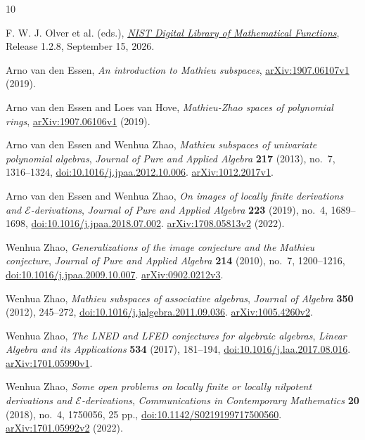 \documentclass[11pt]{article}
\begin{document}
\begin{thebibliography}{10}
\raggedright
{}
F. W. J. Olver et al. (eds.),
\href{https://dlmf.nist.gov/}{\emph{NIST Digital Library of Mathematical
Functions}}, Release 1.2.8, September 15, 2026.

Arno van den Essen, \emph{An introduction to Mathieu subspaces},
\href{https://arxiv.org/abs/1907.06107v1}{arXiv:1907.06107v1} (2019).

Arno van den Essen and Loes van Hove, \emph{Mathieu-Zhao spaces of
polynomial rings},
\href{https://arxiv.org/abs/1907.06106v1}{arXiv:1907.06106v1} (2019).

Arno van den Essen and Wenhua Zhao, \emph{Mathieu subspaces of univariate
polynomial algebras}, \emph{Journal of Pure and Applied Algebra}
\textbf{217} (2013), no.~7, 1316--1324,
\href{https://doi.org/10.1016/j.jpaa.2012.10.006}{doi:10.1016/j.jpaa.2012.10.006}.
\href{https://arxiv.org/abs/1012.2017v1}{arXiv:1012.2017v1}.

Arno van den Essen and Wenhua Zhao, \emph{On images of locally finite
derivations and $\mathcal E$-derivations}, \emph{Journal of Pure and
Applied Algebra} \textbf{223} (2019), no.~4, 1689--1698,
\href{https://doi.org/10.1016/j.jpaa.2018.07.002}{doi:10.1016/j.jpaa.2018.07.002}.
\href{https://arxiv.org/abs/1708.05813v2}{arXiv:1708.05813v2} (2022).

Wenhua Zhao, \emph{Generalizations of the image conjecture and the
Mathieu conjecture}, \emph{Journal of Pure and Applied Algebra}
\textbf{214} (2010), no.~7, 1200--1216,
\href{https://doi.org/10.1016/j.jpaa.2009.10.007}{doi:10.1016/j.jpaa.2009.10.007}.
\href{https://arxiv.org/abs/0902.0212v3}{arXiv:0902.0212v3}.

Wenhua Zhao, \emph{Mathieu subspaces of associative algebras},
\emph{Journal of Algebra} \textbf{350} (2012), 245--272,
\href{https://doi.org/10.1016/j.jalgebra.2011.09.036}{doi:10.1016/j.jalgebra.2011.09.036}.
\href{https://arxiv.org/abs/1005.4260v2}{arXiv:1005.4260v2}.

Wenhua Zhao, \emph{The LNED and LFED conjectures for algebraic algebras},
\emph{Linear Algebra and its Applications} \textbf{534} (2017), 181--194,
\href{https://doi.org/10.1016/j.laa.2017.08.016}{doi:10.1016/j.laa.2017.08.016}.
\href{https://arxiv.org/abs/1701.05990v1}{arXiv:1701.05990v1}.

Wenhua Zhao, \emph{Some open problems on locally finite or locally
nilpotent derivations and $\mathcal E$-derivations},
\emph{Communications in Contemporary Mathematics} \textbf{20} (2018),
no.~4, 1750056, 25 pp.,
\href{https://doi.org/10.1142/S0219199717500560}{doi:10.1142/S0219199717500560}.
\href{https://arxiv.org/abs/1701.05992v2}{arXiv:1701.05992v2} (2022).


\end{thebibliography}
\end{document}

